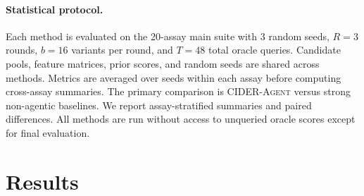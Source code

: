 \documentclass{article}
\newcommand{\agent}{\textsc{CIDER-Agent}}
\begin{document}
\paragraph{Statistical protocol.} Each method is evaluated on the 20-assay main suite with 3 random seeds, $R=3$ rounds, $b=16$ variants per round, and $T=48$ total oracle queries. Candidate pools, feature matrices, prior scores, and random seeds are shared across methods. Metrics are averaged over seeds within each assay before computing cross-assay summaries. The primary comparison is \agent{} versus strong non-agentic baselines. We report assay-stratified summaries and paired differences. All methods are run without access to unqueried oracle scores except for final evaluation.

\section{Results}
\label{sec:results}
\end{document}
